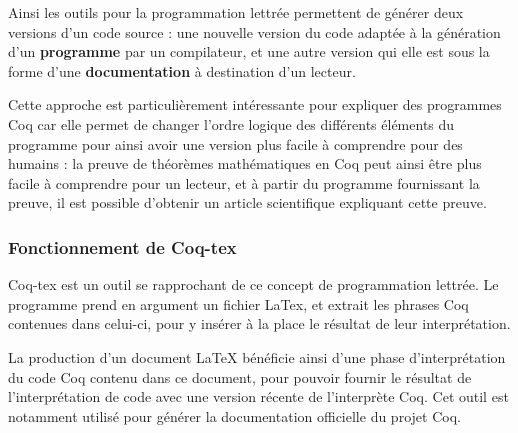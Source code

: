 \documentclass[a4paper, 11pt]{report}
\begin{document}
    Ainsi les outils pour la programmation lettrée permettent de générer deux
    versions d'un code source : une nouvelle version du code adaptée à la
    génération d'un \textbf{programme} par un compilateur, et une autre version
    qui elle est sous la forme d'une \textbf{documentation} à destination d'un
    lecteur.

    Cette approche est particulièrement intéressante pour expliquer des
    programmes Coq car elle permet de changer l'ordre logique des différents
    éléments du programme pour ainsi avoir une version plus facile à comprendre
    pour des humains : la preuve de théorèmes mathématiques en Coq peut ainsi
    être plus facile à comprendre pour un lecteur, et à partir du programme
    fournissant la preuve, il est possible d'obtenir un article scientifique
    expliquant cette preuve.

    \subsubsection{Fonctionnement de Coq-tex}
    Coq-tex est un outil se rapprochant de ce concept de programmation lettrée.
    Le programme prend en argument un fichier LaTex, et extrait les phrases
    Coq contenues dans celui-ci, pour y insérer à la place le résultat de
    leur interprétation.

    La production d'un document LaTeX bénéficie ainsi d'une phase
    d'interprétation du code Coq contenu dans ce document, pour pouvoir fournir
    le résultat de l'interprétation de code avec une version récente de
    l'interprète Coq. Cet outil est notamment utilisé pour générer la documentation
    officielle du projet Coq.
\end{document}
